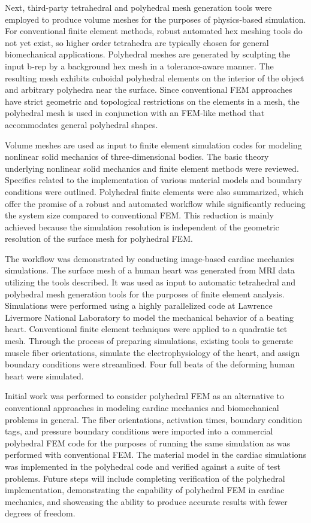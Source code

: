 Next, third-party tetrahedral and polyhedral mesh generation tools were employed to produce volume meshes for the purposes of physics-based simulation. For conventional finite element methods, robust automated hex meshing tools do not yet exist, so higher order tetrahedra are typically chosen for general biomechanical applications. Polyhedral meshes are generated by sculpting the input b-rep by a background hex mesh in a tolerance-aware manner. The resulting mesh exhibits cuboidal polyhedral elements on the interior of the object and arbitrary polyhedra near the surface. Since conventional FEM approaches have strict geometric and topological restrictions on the elements in a mesh, the polyhedral mesh is used in conjunction with an FEM-like method that accommodates general polyhedral shapes.

Volume meshes are used as input to finite element simulation codes for modeling nonlinear solid mechanics of three-dimensional bodies. The basic theory underlying nonlinear solid mechanics and finite element methods were reviewed. Specifics related to the implementation of various material models and boundary conditions were outlined. Polyhedral finite elements were also summarized, which offer the promise of a robust and automated workflow while significantly reducing the system size compared to conventional FEM. This reduction is mainly achieved because the simulation resolution is independent of the geometric resolution of the surface mesh for polyhedral FEM.

The workflow was demonstrated by conducting image-based cardiac mechanics simulations. The surface mesh of a human heart was generated from MRI data utilizing the tools described. It was used as input to automatic tetrahedral and polyhedral mesh generation tools for the purposes of finite element analysis. Simulations were performed using a highly parallelized code at Lawrence Livermore National Laboratory to model the mechanical behavior of a beating heart. Conventional finite element techniques were applied to a quadratic tet mesh. Through the process of preparing simulations, existing tools to generate muscle fiber orientations, simulate the electrophysiology of the heart, and assign boundary conditions were streamlined. Four full beats of the deforming human heart were simulated.

Initial work was performed to consider polyhedral FEM as an alternative to conventional approaches in modeling cardiac mechanics and biomechanical problems in general. The fiber orientations, activation times, boundary condition tags, and pressure boundary conditions were imported into a commercial polyhedral FEM code for the purposes of running the same simulation as was performed with conventional FEM. The material model in the cardiac simulations was implemented in the polyhedral code and verified against a suite of test problems. Future steps will include completing verification of the polyhedral implementation, demonstrating the capability of polyhedral FEM in cardiac mechanics, and showcasing the ability to produce accurate results with fewer degrees of freedom.

